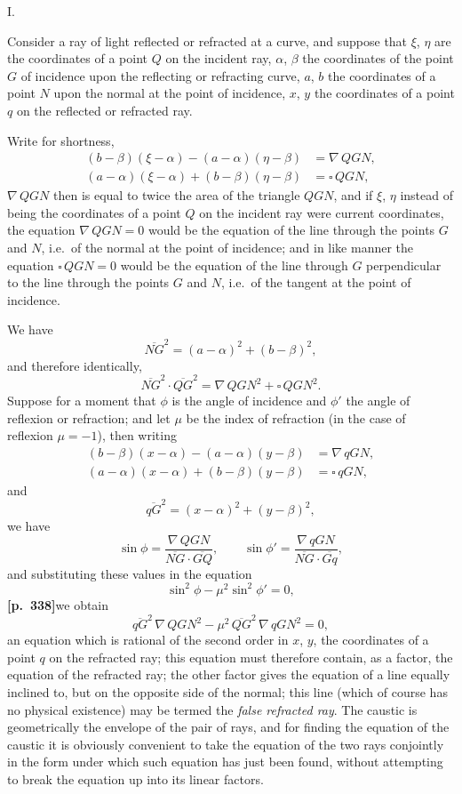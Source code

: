 \documentclass[11pt]{article}
\begin{document}
\medskip
\begin{center}I.\end{center}

Consider a ray of light reflected or refracted at a curve, and suppose that $\xi$, $\eta$ are the coordinates of a point $Q$ on the incident ray, $\alpha$, $\beta$ the coordinates of the point $G$ of incidence upon the reflecting or refracting curve, $a$, $b$ the coordinates of a point $N$ upon the normal at the point of incidence, $x$, $y$ the coordinates of a point $q$ on the reflected or refracted ray.

Write for shortness,
\begin{align*}
(b-\beta)(\xi-\alpha) - (a-\alpha)(\eta-\beta) &= \nabla\, QGN,\\
(a-\alpha)(\xi-\alpha) + (b-\beta)(\eta-\beta) &= \square\, QGN,
\end{align*}
$\nabla\, QGN$ then is equal to twice the area of the triangle $QGN$, and if $\xi$, $\eta$ instead of being the coordinates of a point $Q$ on the incident ray were current coordinates, the equation $\nabla\, QGN = 0$ would be the equation of the line through the points $G$ and $N$, i.e.\ of the normal at the point of incidence; and in like manner the equation $\square\, QGN = 0$ would be the equation of the line through $G$ perpendicular to the line through the points $G$ and $N$, i.e.\ of the tangent at the point of incidence.

We have
\[
\overline{NG}^{2} = (a-\alpha)^{2} + (b-\beta)^{2},
\]
and therefore identically,
\[
\overline{NG}^{2}\cdot\overline{QG}^{2} = \nabla\, QGN^{2} + \square\, QGN^{2}.
\]
Suppose for a moment that $\phi$ is the angle of incidence and $\phi'$ the angle of reflexion or refraction; and let $\mu$ be the index of refraction (in the case of reflexion $\mu = -1$), then writing
\begin{align*}
(b-\beta)(x-\alpha) - (a-\alpha)(y-\beta) &= \nabla\, qGN,\\
(a-\alpha)(x-\alpha) + (b-\beta)(y-\beta) &= \square\, qGN,
\end{align*}
and
\[
\overline{qG}^{2} = (x-\alpha)^{2} + (y-\beta)^{2},
\]
we have
\[
\sin\phi = \frac{\nabla\, QGN}{\overline{NG}\cdot\overline{GQ}},\qquad \sin\phi' = \frac{\nabla\, qGN}{\overline{NG}\cdot\overline{Gq}},
\]
and substituting these values in the equation
\[
\sin^{2}\phi - \mu^{2}\sin^{2}\phi' = 0,
\]
\textbf{[p.~338]}\quad we obtain
\[
\overline{qG}^{2}\,\nabla\, QGN^{2} - \mu^{2}\,\overline{QG}^{2}\,\nabla\, qGN^{2} = 0,
\]
an equation which is rational of the second order in $x$, $y$, the coordinates of a point $q$ on the refracted ray; this equation must therefore contain, as a factor, the equation of the refracted ray; the other factor gives the equation of a line equally inclined to, but on the opposite side of the normal; this line (which of course has no physical existence) may be termed the \textit{false refracted ray}. The caustic is geometrically the envelope of the pair of rays, and for finding the equation of the caustic it is obviously convenient to take the equation of the two rays conjointly in the form under which such equation has just been found, without attempting to break the equation up into its linear factors.
\end{document}
